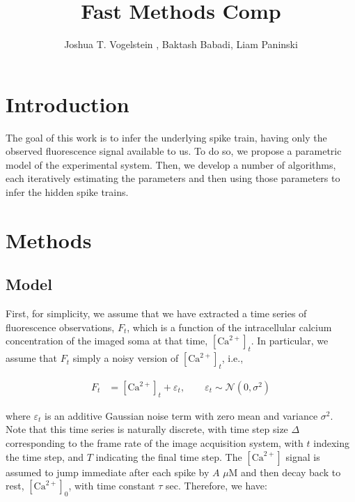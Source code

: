 \documentclass[12pt]{article}
\title{Fast Methods Comp}
\author{Joshua T. Vogelstein%
, Baktash Babadi, Liam Paninski
}
\newcommand{\Ca}{[\text{Ca}^{2+}]}
\begin{document}
\maketitle %
\tableofcontents

\begin{abstract}

\end{abstract}

\section{Introduction}

The goal of this work is to infer the underlying spike train, having only the observed fluorescence signal available to us.  To do so, we propose a parametric model of the experimental system.  Then, we develop a number of algorithms, each iteratively estimating the parameters and then using those parameters to infer the hidden spike trains.  

\section{Methods}
\subsection{Model}

First, for simplicity, we assume that we have extracted a time series of fluorescence observations, $F_t$, which is a function of the intracellular calcium concentration of the imaged soma at that time, $\Ca_t$.  In particular, we assume that $F_t$ simply a noisy version of $\Ca_t$, i.e.,

\begin{align} \label{eq:F}
F_t &=  \Ca_t + \varepsilon_t, \qquad \varepsilon_t \sim \mathcal{N}(0,\sigma^2)
\end{align}

\noindent where $\varepsilon_t$ is an additive Gaussian noise term with zero mean and variance $\sigma^2$. Note that this time series is naturally discrete, with time step size $\Delta$ corresponding to the frame rate of the image acquisition system, with $t$ indexing the time step, and $T$ indicating the final time step. The $\Ca$ signal is assumed to jump immediate after each spike by $A$ $\mu$M and then decay back to rest, $\Ca_0$, with time constant $\tau$ sec.  Therefore, we have:
\end{document}
